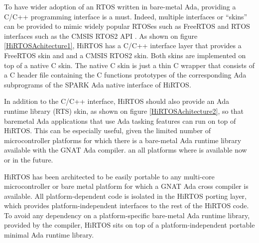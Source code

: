 \documentclass[11pt,letterpaper,twoside,openany]{book}
\begin{document}
To have wider adoption of an RTOS written in bare-metal Ada, providing a C/C++ programming interface
is a must. Indeed, multiple interfaces or ``skins'' can be provided to mimic widely popular
RTOSes such as FreeRTOS \cite{freeRTOS} and RTOS interfaces such as the CMSIS RTOS2 API \cite{cmsisRTOS}.
As shown on figure \ref{HiRTOSAchitecture1}, HiRTOS has a C/C++ interface layer that provides
a FreeRTOS skin and and a CMSIS RTOS2 skin. Both skins are implemented on top of a native C skin.
The native C skin is just a thin C wrapper that consists of a C header file containing the C
functions prototypes of the corresponding Ada subprograms of the SPARK Ada native interface of HiRTOS.

In addition to the C/C++ interface, HiRTOS should also provide an Ada runtime library (RTS) skin,
as shown on figure \ref{HiRTOSAchitecture2}, so that baremetal Ada applications that use Ada tasking
features can run on top of HiRTOS. This can be especially useful, given the limited number of
microcontroller platforms for which there is a bare-metal Ada runtime library available with the
GNAT Ada compiler. an all platforms where is available now or in the future.

HiRTOS has been architected to be easily portable to any multi-core microcontroller or bare metal
platform for which a GNAT Ada cross compiler is available. All platform-dependent code is isolated in the
HiRTOS porting layer, which provides platform-independent interfaces to the rest of the HiRTOS code.
To avoid any dependency on a platform-specific bare-metal Ada runtime library, provided by the
compiler, HiRTOS sits on top of a platform-independent portable minimal Ada runtime library.
\end{document}
